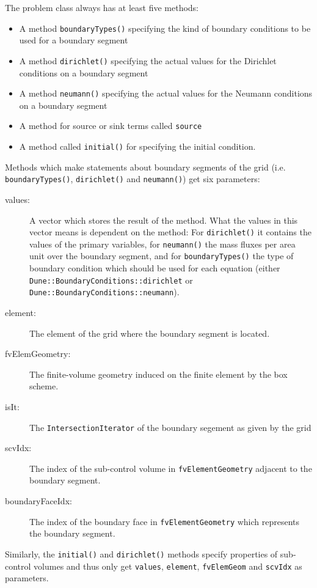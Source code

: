 The problem class always has at least five methods:
\begin{itemize}
\item A method \texttt{boundaryTypes()} specifying the kind of
  boundary conditions to be used for a boundary segment
\item A method \texttt{dirichlet()} specifying the actual values for
  the Dirichlet conditions on a boundary segment
\item A method \texttt{neumann()} specifying the actual values for
  the Neumann conditions on a boundary segment
\item A method for source or sink terms called \texttt{source}
\item A method called \texttt{initial()} for specifying the initial
  condition.
\end{itemize}

Methods which make statements about boundary segments of the grid (i.e. 
\texttt{boundaryTypes()}, \texttt{dirichlet()} and \texttt{neumann()}) get 
six parameters:
\begin{description}
\item[values:] A vector which stores the result of the method. What
  the values in this vector means is dependent on the method: For
  \texttt{dirichlet()} it contains the values of the primary
  variables, for \texttt{neumann()} the mass fluxes per area unit
  over the boundary segment, and for \texttt{boundaryTypes()} 
  the type of boundary condition which should be used for
  each equation (either \texttt{Dune::BoundaryConditions::dirichlet} or
  \texttt{Dune::BoundaryConditions::neumann}).
\item[element:] The element of the grid where the boundary segment
  is located.
\item[fvElemGeometry:] The finite-volume geometry induced on the
  finite element by the box scheme.
\item[isIt:] The \texttt{IntersectionIterator} of the boundary
  segement as given by the grid
\item[scvIdx:] The index of the sub-control volume in
  \texttt{fvElementGeometry} adjacent to the boundary segment.
\item[boundaryFaceIdx:] The index of the boundary face in
  \texttt{fvElementGeometry} which represents the boundary segment.  
\end{description}

Similarly, the \texttt{initial()} and \texttt{dirichlet()} methods
specify properties of sub-control volumes and thus only get
\texttt{values}, \texttt{element}, \texttt{fvElemGeom} and
\texttt{scvIdx} as parameters.

